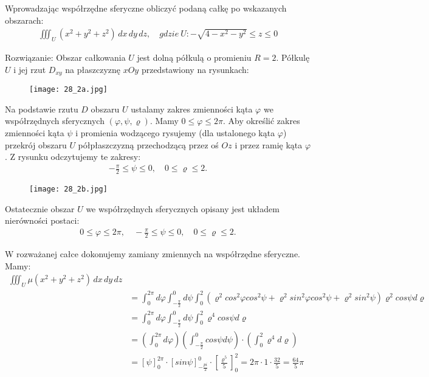 \documentclass[main.tex]{subfiles}
\begin{document}
    \begin{exercise}
        Wprowadzając współrzędne sferyczne obliczyć podaną całkę po wskazanych obszarach:
        \begin{align*}
            \iiint_U (x^2+y^2+z^2) \,dx\,dy\,dz, \quad gdzie \ U: -\sqrt{4-x^2-y^2} \leq z \leq 0
        \end{align*}
    \end{exercise}
    Rozwiązanie:
    Obszar całkowania $U$ jest dolną półkulą o promieniu $R=2$. Półkulę $U$ i jej rzut $D_{xy}$ na płaszczyznę $xOy$ przedstawiony na rysunkach:

    \begin{figure}[H]
        \texttt{[image: 28\_2a.jpg]}
    \end{figure}

    Na podstawie rzutu $D$ obszaru $U$ ustalamy zakres zmienności kąta $\varphi$ we współrzędnych sferycznych $(\varphi, \psi, \varrho)$. Mamy $0 \leq \varphi \leq 2\pi$. Aby określić zakres zmienności kąta $\psi$ i promienia wodzącego rysujemy (dla ustalonego kąta $\varphi$) przekrój obszaru $U$ półpłaszczyzną przechodzącą przez oś $Oz$ i przez ramię kąta $\varphi$. Z rysunku odczytujemy te zakresy:
    \begin{align*}
        -\frac{\pi}{2} \leq \psi \leq 0, \quad 0 \leq \varrho \leq 2.
    \end{align*}

    \begin{figure}[H]
        \texttt{[image: 28\_2b.jpg]}
    \end{figure}

    Ostatecznie obszar $U$ we współrzędnych sferycznych opisany jest układem nierówności postaci:
    \begin{align*}
        0 \leq \varphi \leq 2\pi, \quad -\frac{\pi}{2}\leq \psi \leq 0, \quad 0 \leq \varrho \leq 2.
    \end{align*}

    W rozważanej całce dokonujemy zamiany zmiennych na współrzędne sferyczne. Mamy:
    \begin{align*}
        \iiint_U \mu(x^2+y^2+z^2) \,dx\,dy\,dz
        \\ &= \int_{0}^{2\pi} d\varphi \int_{-\frac{\pi}{2}}^{0} d\psi \int_{0}^{2} (\varrho^2 cos^2\varphi cos^2\psi+\varrho^2 sin^2 \varphi cos^2 \psi + \varrho^2 sin^2 \psi) \varrho^2 cos\psi d\varrho
        \\ &= \int_{0}^{2\pi} d\varphi \int_{-\frac{\pi}{2}}^{0} d\psi \int_{0}^{2} \varrho^4 cos\psi d\varrho
        \\ &= \left(\int_{0}^{2\pi} d\varphi\right) \left(\int_{-\frac{\pi}{2}}^{0} cos\psi d\psi\right)\cdot \left(\int_{0}^{2} \varrho^4 d\varrho \right)
        \\ &= \left[\psi\right]_0^{2\pi} \cdot \left[sin\psi\right]_{-\frac{pi}{2}}^0 \cdot \left[\frac{\varrho ^5}{5}\right]_0^2 = 2\pi \cdot 1 \cdot \frac{32}{5}=\frac{64}{5}\pi
    \end{align*}

    \newpage
\end{document}
